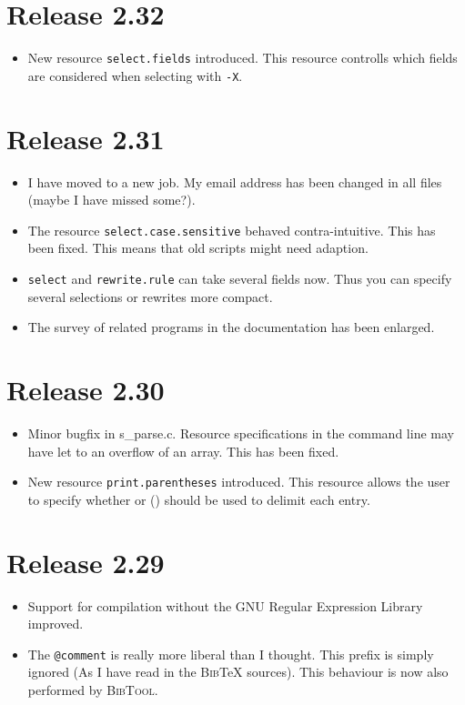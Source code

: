 \documentclass[11pt,a4paper]{scrartcl}
\newcommand\Arg[1]{\texttt{#1}}
\newcommand\rsc[1]{\texttt{#1}}
\newcommand\File[1]{\textsf{#1}}
\newcommand\BibTool{\textsc{BibTool}}
\newcommand\BibTeX{\textsc{Bib}\TeX}
\newenvironment{Release}[2]{%
  \def\tmp{#2}%
  \section*{Release #1 \ifx\tmp\empty\else{\normalsize[#2]}\fi}
  \begin{itemize}
}{\end{itemize}}
\newenvironment{Fix}[1]{\item }{}
\newenvironment{New}[1]{\item }{}
\newenvironment{Doc}[1]{\item }{}
\newenvironment{Update}[1]{\item }{}
\begin{document}
\begin{multicols}
 \begin{Release}{2.32}{}
  \begin{New}{gene}
    New resource \rsc{select.fields} introduced. This resource
    controlls which fields are considered when selecting with
    \Arg{-X}.
  \end{New}
 \end{Release}

 \begin{Release}{2.31}{}
  \begin{Update}{gene}
    I have moved to a new job. My email address has been changed in
    all files (maybe I have missed some?).
  \end{Update}
  \begin{Fix}{gene}
    The resource \rsc{select.case.sensitive} behaved
    contra-intuitive. This has been fixed. This means that old scripts
    might need adaption.
  \end{Fix}
  \begin{Update}{gene}
    \rsc{select} and 
\rsc{rewrite.rule} can take several
    fields now. Thus you can specify several selections or rewrites
    more compact.
  \end{Update}
  \begin{Doc}{gene}
    The survey of related programs in the documentation has been
    enlarged.
  \end{Doc}
 \end{Release}

 \begin{Release}{2.30}{}
  \begin{Fix}{gene}
    Minor bugfix in \File{s\_parse.c}. Resource specifications in
    the command line may have let to an overflow of an array. This has
    been fixed.
  \end{Fix}
  \begin{New}{gene}
    New resource \rsc{print.parentheses} introduced. This
    resource allows the user to specify whether {} or () should be
    used to delimit each entry.
  \end{New}
 \end{Release}

 \begin{Release}{2.29}{}
  \begin{Update}{gene}
    Support for compilation without the GNU Regular Expression Library
    improved.
  \end{Update}
  \begin{Update}{gene}
    The \verb|@comment| is really more liberal than I thought. This
    prefix is simply ignored (As I have read in the \BibTeX{}
    sources). This behaviour is now also performed by \BibTool{}.
  \end{Update}
 \end{Release}


\end{multicols}
\end{document}
